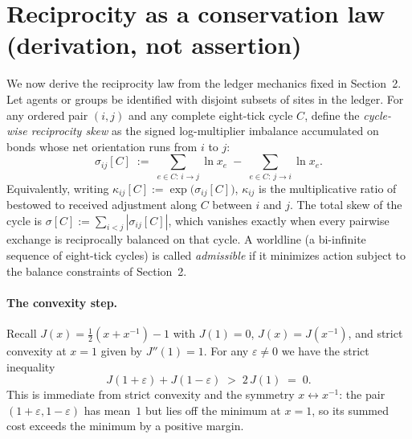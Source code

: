 \documentclass[11pt]{article}
\begin{document}
\section{Reciprocity as a conservation law (derivation, not assertion)}

We now derive the reciprocity law from the ledger mechanics fixed in Section~2. Let agents or groups be identified with disjoint subsets of sites in the ledger. For any ordered pair $(i,j)$ and any complete eight-tick cycle $C$, define the \emph{cycle-wise reciprocity skew} as the signed log-multiplier imbalance accumulated on bonds whose net orientation runs from $i$ to $j$:
\[
\sigma_{ij}[C]
\;:=\;
\sum_{e\in C:\,i\to j}\!\!\ln x_e
\;-\;
\sum_{e\in C:\,j\to i}\!\!\ln x_e.
\]
Equivalently, writing $\kappa_{ij}[C]:=\exp\big(\sigma_{ij}[C]\big)$, $\kappa_{ij}$ is the multiplicative ratio of bestowed to received adjustment along $C$ between $i$ and $j$. The total skew of the cycle is $\sigma[C]:=\sum_{i<j}|\sigma_{ij}[C]|$, which vanishes exactly when every pairwise exchange is reciprocally balanced on that cycle. A worldline (a bi-infinite sequence of eight-tick cycles) is called \emph{admissible} if it minimizes action subject to the balance constraints of Section~2.

\paragraph{The convexity step.}
Recall $J(x)=\tfrac12(x+x^{-1})-1$ with $J(1)=0$, $J(x)=J(x^{-1})$, and strict convexity at $x=1$ given by $J''(1)=1$. For any $\varepsilon\neq 0$ we have the strict inequality
\begin{equation}
J(1+\varepsilon)+J(1-\varepsilon) \;>\; 2\,J(1) \;=\; 0.
\label{eq:strictpair}
\end{equation}
This is immediate from strict convexity and the symmetry $x\leftrightarrow x^{-1}$: the pair $(1+\varepsilon,1-\varepsilon)$ has mean~$1$ but lies off the minimum at $x=1$, so its summed cost exceeds the minimum by a positive margin.
\end{document}
